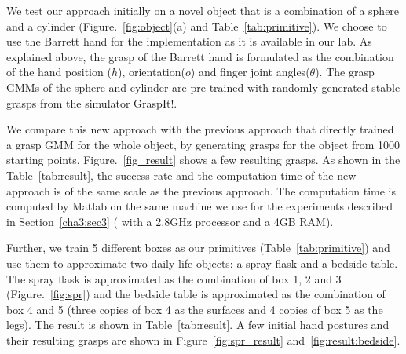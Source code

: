 We test our approach initially on a novel object that is a combination of a sphere and a cylinder (Figure.~\ref{fig:object}(a) and Table~\ref{tab:primitive}). We choose to use the Barrett hand for the implementation as it is available in our lab. As explained above, the grasp of the Barrett hand is formulated as the combination of the hand position ($h$), orientation($o$) and finger joint angles($\theta$).  The grasp GMMs of the sphere and cylinder are pre-trained with randomly generated stable grasps from the simulator GraspIt!.

We compare this new approach with the previous approach that directly trained a grasp GMM for the whole object, by generating grasps for the object from 1000 starting points. Figure.~\ref{fig_result} shows a few resulting grasps. As shown in the Table~\ref{tab:result}, the success rate and the computation time of the new approach is of the same scale as the previous approach. The computation time is computed by Matlab on the same machine we use for the experiments described in Section~\ref{cha3:sec3} ( with a 2.8GHz processor and a 4GB RAM).


Further, we train 5 different boxes as our primitives (Table~\ref{tab:primitive}) and use them to approximate two daily life objects: a spray flask and a bedside table. The spray flask is approximated as the combination of box 1, 2 and 3 (Figure.~\ref{fig:spr}) and the bedside table is approximated as the combination of box 4 and 5 (three copies of box 4 as the surfaces and 4 copies of box 5 as the legs). The result is shown in Table~\ref{tab:result}. A few initial hand postures and their resulting grasps are shown in Figure~\ref{fig:spr_result} and~\ref{fig:result:bedside}.

